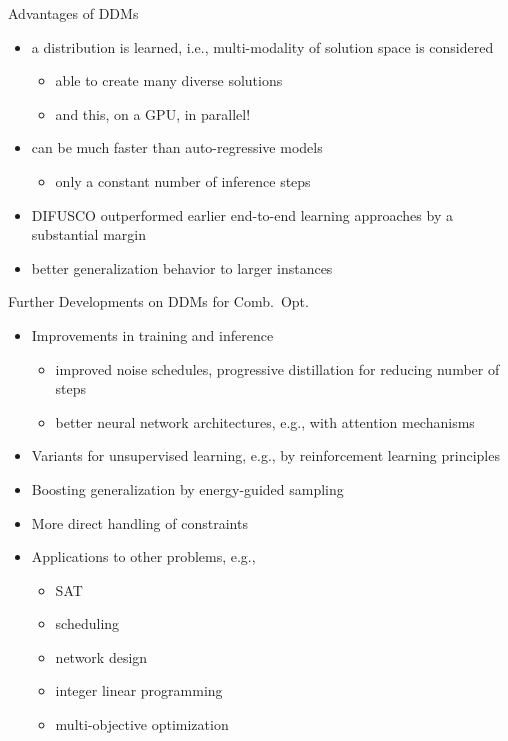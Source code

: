 \documentclass[aspectratio=1610]{beamer}
\newcommand{\important}[1]{{\color{green!60!black}#1}}
\begin{document}
\begin{frame}{Advantages of DDMs}
	\begin{itemize}
		\itemsep4ex
		\item a distribution is learned, i.e., \important{multi-modality of solution space is considered}
		\begin{itemize}
			\item[\(\rightarrow\)] able to create many diverse solutions
			\item[\(\rightarrow\)] and this, on a GPU, in parallel!
		\end{itemize}
		\item can be \important{much faster} than auto-regressive models
		\begin{itemize}
			\item only a constant number of inference steps
		\end{itemize}
		\item DIFUSCO \important{outperformed earlier end-to-end learning approaches} by a substantial margin
		\item \important{better generalization behavior} to larger instances
	\end{itemize}
\end{frame}


\begin{frame}{Further Developments on DDMs for Comb.~Opt.}
	\begin{itemize}
		\itemsep2ex
		\item Improvements in training and inference 
		\begin{itemize}
			\item improved noise schedules, progressive distillation for reducing number of steps
			\item better neural network architectures, e.g., with attention mechanisms
		\end{itemize}
		\item Variants for unsupervised learning, e.g., by reinforcement learning principles
		\item Boosting generalization by energy-guided sampling
		\item More direct handling of constraints
		\item Applications to other problems, e.g., 
		\begin{itemize}
			\item SAT
			\item scheduling
			\item network design
			\item integer linear programming
			\item multi-objective optimization
		\end{itemize}
	\end{itemize}
\end{frame}
\end{document}
